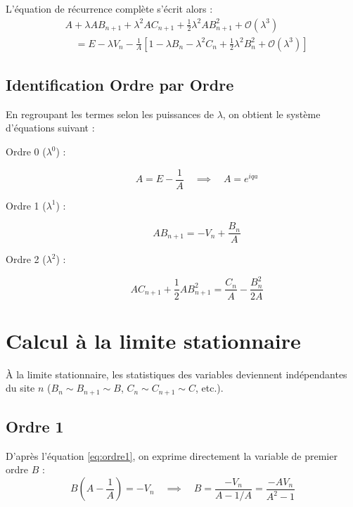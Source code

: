 L'équation de récurrence complète s'écrit alors :
\begin{align}
    &A + \lambda A B_{n+1} + \lambda^2 A C_{n+1} + \tfrac{1}{2}\lambda^2 A B_{n+1}^2 + \mathcal{O}(\lambda^3) \nonumber \\
    &\quad = E - \lambda V_n - \frac{1}{A} \left[ 1 - \lambda B_n - \lambda^2 C_n + \tfrac{1}{2}\lambda^2 B_n^2 + \mathcal{O}(\lambda^3) \right]
\end{align}

\subsection{Identification Ordre par Ordre}

En regroupant les termes selon les puissances de $\lambda$, on obtient le système d'équations suivant :
\begin{description}
    \item[Ordre 0 ($\lambda^0$) :]
    \begin{equation}
        A = E - \frac{1}{A} \quad \implies \quad A = e^{iqa} \label{eq:ordre0}
    \end{equation}
    \item[Ordre 1 ($\lambda^1$) :]
    \begin{equation}
        A B_{n+1} = -V_n + \frac{B_n}{A} \label{eq:ordre1}
    \end{equation}
    \item[Ordre 2 ($\lambda^2$) :]
    \begin{equation}
        A C_{n+1} + \frac{1}{2}A B_{n+1}^2 = \frac{C_n}{A} - \frac{B_n^2}{2A} \label{eq:ordre2}
    \end{equation}
\end{description}

\section{Calcul à la limite stationnaire}

À la limite stationnaire, les statistiques des variables deviennent indépendantes du site $n$ ($B_n \sim B_{n+1} \sim B$, $C_n \sim C_{n+1} \sim C$, etc.).

\subsection{Ordre 1}
D'après l'équation \eqref{eq:ordre1}, on exprime directement la variable de premier ordre $B$ :
\begin{equation}
    B \left( A - \frac{1}{A} \right) = -V_n \quad \implies \quad B = \frac{-V_n}{A - 1/A} = \frac{-A V_n}{A^2 - 1}
\end{equation}

